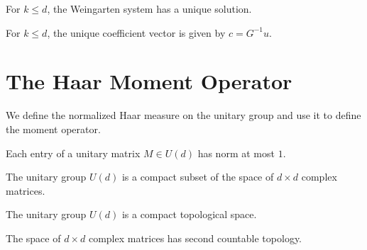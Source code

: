 \begin{theorem}\label{thm:weingarten_solution_unique}
  \leanok
  For $k \le d$, the Weingarten system has a unique solution.
\end{theorem}

\begin{theorem}\label{thm:weingarten_solution_eq_inv}
  \leanok
  For $k \le d$, the unique coefficient vector is given by $c = G^{-1} u$.
\end{theorem}

\section{The Haar Moment Operator}

We define the normalized Haar measure on the unitary group and use it to define the moment operator.

\begin{theorem}\label{thm:unitary_entry_norm_le_one}
  \leanok
  Each entry of a unitary matrix $M \in U(d)$ has norm at most $1$.
\end{theorem}

\begin{theorem}\label{thm:isCompact_unitaryGroup}
  \leanok
  The unitary group $U(d)$ is a compact subset of the space of $d \times d$ complex matrices.
\end{theorem}

\begin{theorem}\label{thm:instCompactSpaceUnitaryGroup}
  \leanok
  The unitary group $U(d)$ is a compact topological space.
\end{theorem}

\begin{theorem}\label{thm:instSecondCountableMatrix}
  \leanok
  The space of $d \times d$ complex matrices has second countable topology.
\end{theorem}

